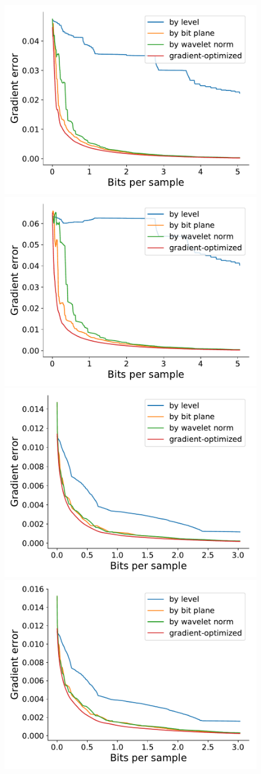 \begin{figure}
	\centering
	{\includegraphics[width=0.48\linewidth]{img/gradient/3points/gradient-optimized-boiler.pdf}}
	{\includegraphics[width=0.48\linewidth]{img/gradient/5points/gradient-optimized-boiler.pdf}}
	{\includegraphics[width=0.48\linewidth]{img/gradient/3points/gradient-optimized-diffusivity.pdf}}
	{\includegraphics[width=0.48\linewidth]{img/gradient/5points/gradient-optimized-diffusivity.pdf}}

\end{figure}
